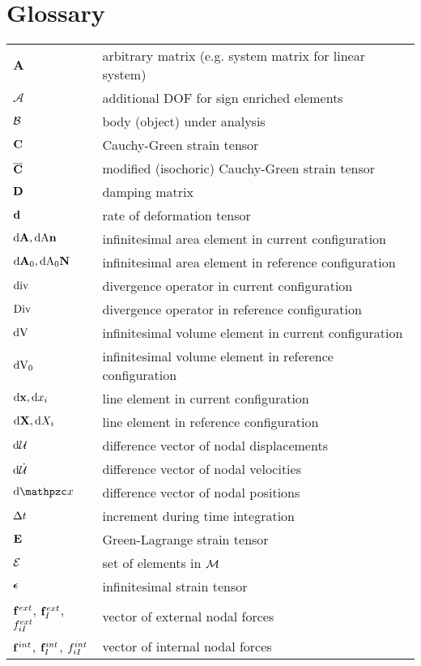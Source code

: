 \chapter{Glossary}





\setlength{\tabulinesep}{3pt}


    \begin{longtabu}{ R{2.4cm}  L{8cm} }
		$\mathbf A$ & arbitrary matrix (e.g. system matrix for linear system) \\
		$\mathcal{A}$ & additional DOF for sign enriched elements\\
		$\mathcal{B} $ & body (object) under analysis \\
		$\mathbf {C} $ & Cauchy-Green strain tensor \\
		$\mathbf {\overline{C} }$ & modified (isochoric) Cauchy-Green strain tensor \\
		$\mathbf D$ & damping matrix\\
		$\mathbf {d} $ & rate of deformation tensor \\
				$ \textnormal{d}\mathbf{A} ,  \textnormal{dA} \mathbf {n}  $& infinitesimal area element in current configuration \\
				$ \textnormal{d}\mathbf{A}_0 ,  \textnormal{dA}_0 \mathbf {N}  $& infinitesimal area element in reference configuration \\
				$ \textnormal{div}$ & divergence operator in current configuration \\
				$ \textnormal{Div}$ & divergence operator in reference configuration \\
					$ \textnormal{dV} $& infinitesimal volume element in current configuration \\
		$ \textnormal{dV}_0 $& infinitesimal volume element in reference configuration \\
		$\textnormal{d} \mathbf {x },\textnormal{d} {x }_i $& line element in current configuration \\
		$\textnormal{d} \mathbf {X },\textnormal{d} {X }_i$& line element in reference configuration \\
				$\textnormal{d}{\mathcal{U}} $ & difference vector of nodal displacements \\
						$\textnormal{d}\dot{\mathcal{U}} $ & difference vector of nodal velocities \\
		$\mcdx$ & difference vector of nodal positions \\
		$\Delta t $ & increment during time integration \\

		$\mathbf {E} $ & Green-Lagrange strain tensor \\
		$\mathcal{E}$ & set of elements in $\mathcal{M}$ \\
		$\boldsymbol{\epsilon}$ & infinitesimal strain tensor \\
		$\mathbf f ^{ext}$, $\mathbf f ^{ext}_I$, $f ^{ext}_{iI}$ & vector of external nodal forces \\
		$\mathbf f ^{int}$, $\mathbf f ^{int}_I$, $f ^{int}_{iI} $ & vector of internal nodal forces \\
		

\end{longtabu}
